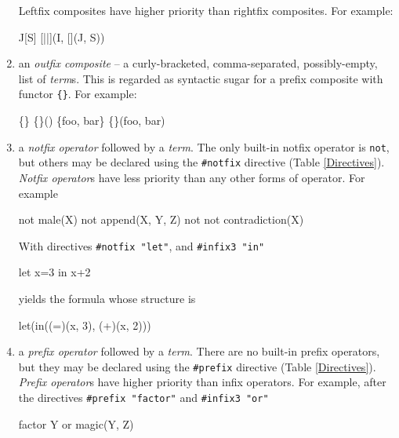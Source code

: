 \begin{enumerate}
Leftfix composites have higher priority than rightfix composites. For example:
\begin{smalltt}
        [|I|]J[S]  [||](I, [](J, S))
\end{smalltt}
\item an \emph{outfix composite} -- a curly-bracketed, 
        comma-separated, possibly-empty, list of \emph{term}s. 
        This is regarded as syntactic sugar 
        for a prefix composite with functor {\tt{\{\}}}.
For example:
\begin{smalltt}
        \{\}  \{\}()
        \{foo, bar\}  \{\}(foo, bar)
\end{smalltt}

\item  a 
\emph{notfix operator} followed by a \emph{term}. The only built-in 
notfix operator is {\tt not}, but others may be declared using the {\tt{\#notfix}}
directive (Table \ref{Directives}). \emph{Notfix operator}s have less priority than 
any other forms of operator. 
For example
\begin{smalltt}
        not male(X)
        not append(X, Y, Z)
        not not contradiction(X)
\end{smalltt}
With directives {\tt \#notfix "let"}, and {\tt \#infix3 "in"}
\begin{smalltt}
        let x=3 in x+2 
\end{smalltt}
yields the formula whose structure is
\begin{smalltt}
        let(in((=)(x, 3), (+)(x, 2)))
\end{smalltt}


\item a 
\emph{prefix operator} followed by a \emph{term}. There are no
built-in prefix operators, but they may be declared using the {\tt{\#prefix}}
directive (Table \ref{Directives}). \emph{Prefix operator}s have higher priority than 
infix operators. 
For example, after the directives {\tt \#prefix "factor"} and
{\tt \#infix3 "or"}
\begin{smalltt}
        factor Y or magic(Y, Z)
\end{smalltt}
\end{enumerate}


